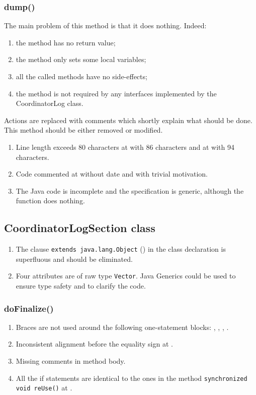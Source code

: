 \subsubsection{dump()}
The main problem of this method is that it does nothing.
Indeed:
\begin{enumerate}
    \item the method has no return value;
    \item the method only sets some local variables;
    \item all the called methods have no side-effects;
    \item the method is not required by any interfaces implemented by the CoordinatorLog class.
\end{enumerate}
Actions are replaced with comments which shortly explain what should be done.
This method should be either removed or modified.
\begin{enumerate}
	\item {} Line length exceeds 80 characters at  with 86 characters and at  with 94 characters.
	\item {} Code commented at  without date and with trivial motivation.
	\item {} The Java code is incomplete and the specification is generic, although the function does nothing.
\end{enumerate}

\subsection{CoordinatorLogSection class}
\label{sec:coordinatorlogsection-class}

\begin{enumerate}
    \item The clause \texttt{extends java.lang.Object} () in the class declaration is superfluous and should be eliminated.
    \item {} Four attributes are of raw type \texttt{Vector}. Java Generics could be used to ensure type safety and to clarify the code.
\end{enumerate}

\subsubsection{doFinalize()}
\begin{enumerate}
    \item {} Braces are not used around the following one-statement blocks: , , , .
    \item {} Inconsistent alignment before the equality sign at .
    \item {} Missing comments in method body.
    \item {} All the if statements are identical to the ones in the method \texttt{synchronized void reUse()} at .
\end{enumerate}

